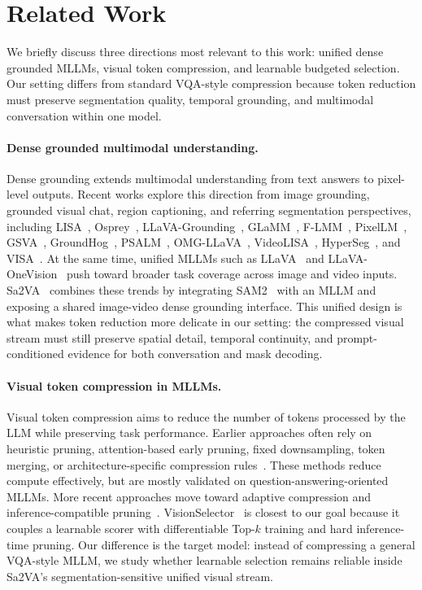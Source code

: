 \section{Related Work}
\label{sec:related}

We briefly discuss three directions most relevant to this work: unified dense grounded MLLMs, visual token compression, and learnable budgeted selection.
Our setting differs from standard VQA-style compression because token reduction must preserve segmentation quality, temporal grounding, and multimodal conversation within one model.

\paragraph{Dense grounded multimodal understanding.}
Dense grounding extends multimodal understanding from text answers to pixel-level outputs.
Recent works explore this direction from image grounding, grounded visual chat, region captioning, and referring segmentation perspectives, including LISA~\cite{lai2023lisa}, Osprey~\cite{yuan2024osprey}, LLaVA-Grounding~\cite{zhang2023llavagrounding}, GLaMM~\cite{rasheed2024glamm}, F-LMM~\cite{wu2024flmm}, PixelLM~\cite{ren2023pixellm}, GSVA~\cite{xia2023gsva}, GroundHog~\cite{zhang2024groundhog}, PSALM~\cite{zhang2024psalm}, OMG-LLaVA~\cite{zhang2024omgllava}, VideoLISA~\cite{bai2024videolisa}, HyperSeg~\cite{wei2024hyperseg}, and VISA~\cite{yan2024visa}.
At the same time, unified MLLMs such as LLaVA~\cite{liu2023visual} and LLaVA-OneVision~\cite{li2024llavaonevision} push toward broader task coverage across image and video inputs.
Sa2VA~\cite{yuan2025sa2va} combines these trends by integrating SAM2~\cite{ravi2024sam2} with an MLLM and exposing a shared image-video dense grounding interface.
This unified design is what makes token reduction more delicate in our setting: the compressed visual stream must still preserve spatial detail, temporal continuity, and prompt-conditioned evidence for both conversation and mask decoding.

\paragraph{Visual token compression in MLLMs.}
Visual token compression aims to reduce the number of tokens processed by the LLM while preserving task performance.
Earlier approaches often rely on heuristic pruning, attention-based early pruning, fixed downsampling, token merging, or architecture-specific compression rules~\cite{bolya2022tome,chen2024fastv,yang2024visionzip,zhang2024sparsevlm,zhu2024focusllava,yao2024deco}.
These methods reduce compute effectively, but are mostly validated on question-answering-oriented MLLMs.
More recent approaches move toward adaptive compression and inference-compatible pruning~\cite{yang2025topv,zhu2025visionselector}.
VisionSelector~\cite{zhu2025visionselector} is closest to our goal because it couples a learnable scorer with differentiable Top-$k$ training and hard inference-time pruning.
Our difference is the target model: instead of compressing a general VQA-style MLLM, we study whether learnable selection remains reliable inside Sa2VA's segmentation-sensitive unified visual stream.

